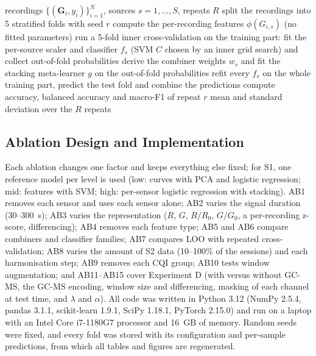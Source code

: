 \begin{algorithm}[!htbp]
\caption[Leakage-free repeated cross-validation with high-level fusion]{Leakage-free repeated cross-validation with high-level fusion}
\label{alg:cv}
\begin{algorithmic}[1]
\REQUIRE recordings $\{(\mathbf{G}_i, y_i)\}_{i=1}^{N}$, sources $s = 1, \dots, S$, repeats $R$
\STATE split the recordings into 5 stratified folds with seed $r$
\STATE compute the per-recording features $\phi(G_{i,s})$ (no fitted parameters)
\STATE run a 5-fold inner cross-validation on the training part: fit the per-source scaler and classifier $f_s$ (SVM $C$ chosen by an inner grid search) and collect out-of-fold probabilities
\STATE derive the combiner weights $w_s$ and fit the stacking meta-learner $g$ on the out-of-fold probabilities
\STATE refit every $f_s$ on the whole training part, predict the test fold and combine the predictions
\ENDFOR
\STATE compute accuracy, balanced accuracy and macro-F1 of repeat $r$
\ENDFOR
\RETURN mean and standard deviation over the $R$ repeats
\end{algorithmic}
\end{algorithm}

\subsection{Ablation Design and Implementation}

Each ablation changes one factor and keeps everything else fixed; for S1, one reference model per level is used (low: curves with PCA and logistic regression; mid: features with SVM; high: per-sensor logistic regression with stacking). AB1 removes each sensor and uses each sensor alone; AB2 varies the signal duration (30--300~s); AB3 varies the representation ($R$, $G$, $R/R_0$, $G/G_0$, a per-recording z-score, differencing); AB4 removes each feature type; AB5 and AB6 compare combiners and classifier families; AB7 compares LOO with repeated cross-validation; AB8 varies the amount of S2 data (10--100\% of the sessions) and each harmonisation step; AB9 removes each CQI group; AB10 tests window augmentation; and AB11--AB15 cover Experiment D (with versus without GC-MS, the GC-MS encoding, window size and differencing, masking of each channel at test time, and $\lambda$ and $\alpha$). All code was written in Python 3.12 (NumPy 2.5.4, pandas 3.1.1, scikit-learn 1.9.1, SciPy 1.18.1, PyTorch 2.15.0) and run on a laptop with an Intel Core i7-1180G7 processor and 16~GB of memory. Random seeds were fixed, and every fold was stored with its configuration and per-sample predictions, from which all tables and figures are regenerated.
\clearpage

